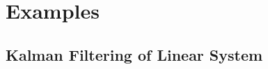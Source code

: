 
\appendix               	%
\chapter{Examples} 
\section{Kalman Filtering of Linear System} \label{ExampleKF} 


